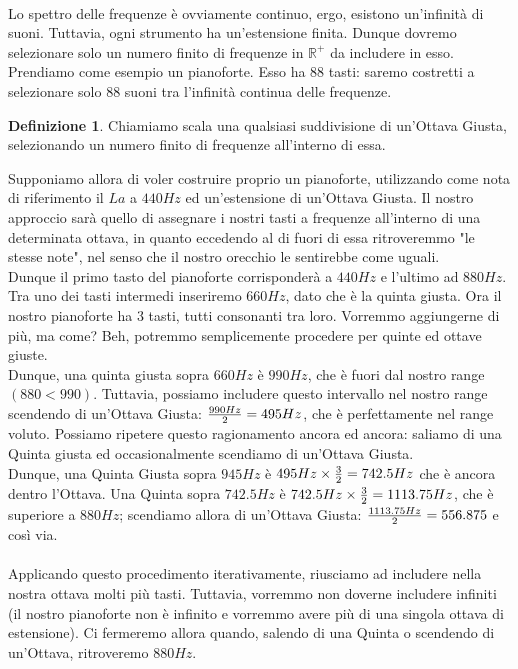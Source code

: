 \documentclass[12pt,a4paper]{report}
\theoremstyle{definition}
\newtheorem{Def}{Definizione}[chapter]
\theoremstyle{Theorem}
\theoremstyle{definition}
\theoremstyle{definition}
\theoremstyle{definition}
\begin{document}
	\\
	Lo spettro delle frequenze è ovviamente continuo, ergo, esistono un'infinità di suoni. Tuttavia, ogni strumento ha un'estensione finita. Dunque dovremo selezionare solo un numero finito di frequenze in $\mathbb{R}^+$ da includere in esso. Prendiamo come esempio un pianoforte. Esso ha 88 tasti: saremo costretti a selezionare solo 88 suoni tra l'infinità continua delle frequenze.
	\begin{Def}
		Chiamiamo scala una qualsiasi suddivisione di un'Ottava Giusta, selezionando un numero finito di frequenze all'interno di essa.
	\end{Def}
	Supponiamo allora di voler costruire proprio un pianoforte, utilizzando come nota di riferimento il $La$ a $440 Hz$ ed un'estensione di un'Ottava Giusta. Il nostro approccio sarà quello di assegnare i nostri tasti a frequenze all'interno di una determinata ottava, in quanto eccedendo al di fuori di essa ritroveremmo "le stesse note", nel senso che il nostro orecchio le sentirebbe come uguali.\\
	Dunque il primo tasto del pianoforte corrisponderà a $440 Hz$ e l'ultimo ad $880 Hz$. Tra uno dei tasti intermedi inseriremo $660 Hz$, dato che è la quinta giusta. Ora il nostro pianoforte ha 3 tasti, tutti consonanti tra loro. Vorremmo aggiungerne di più, ma come? Beh, potremmo semplicemente procedere per quinte ed ottave giuste. \\
	Dunque, una quinta giusta sopra $660 Hz$ è $990Hz$, che è fuori dal nostro range $(880<990)$. Tuttavia, possiamo includere questo intervallo nel nostro range scendendo di un'Ottava Giusta: ${990 Hz\over 2}=495 Hz$, che è perfettamente nel range voluto. Possiamo ripetere questo ragionamento ancora ed ancora: saliamo di una Quinta giusta ed occasionalmente scendiamo di un'Ottava Giusta. \\
	Dunque, una Quinta Giusta sopra $945 Hz$ è $495Hz \times {3\over 2}=742.5Hz$ che è ancora dentro l'Ottava. Una Quinta sopra $742.5 Hz$ è $742.5 Hz\times {3\over 2}=1113.75 Hz$, che è superiore a $880 Hz$; scendiamo allora di un'Ottava Giusta: ${1113.75 Hz\over 2}=556.875$ e così via.\\
	\\
	Applicando questo procedimento iterativamente, riusciamo ad includere nella nostra ottava molti più tasti. Tuttavia, vorremmo non doverne includere infiniti (il nostro pianoforte non è infinito e vorremmo avere più di una singola ottava di estensione). Ci fermeremo allora quando, salendo di una Quinta o scendendo di un'Ottava, ritroveremo $880Hz$.\\
\end{document}
